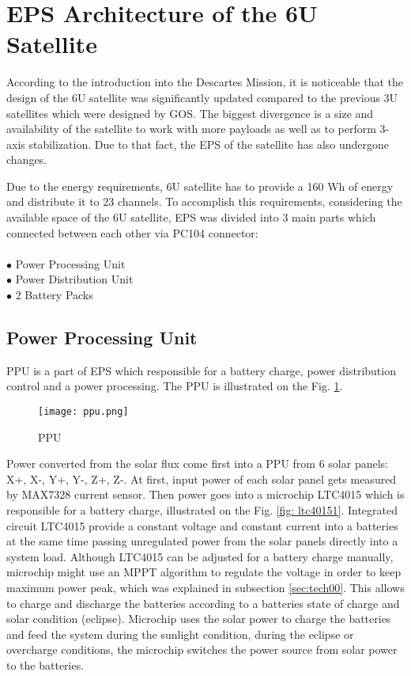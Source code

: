  
  \section{EPS Architecture of the 6U Satellite}
  According to the introduction into the  Descartes Mission, it is noticeable that the design of the 6U satellite was significantly updated compared to the previous 3U satellites which were designed by GOS. The biggest divergence is a size and availability of the satellite to work with more payloads as well as to perform 3-axis stabilization. Due to that fact, the EPS of the satellite has also undergone changes.
  
  Due to the energy requirements, 6U satellite has to provide a 160 Wh of energy and  distribute it to 23 channels. To accomplish this requirements, considering the available space of the 6U satellite, EPS was divided into 3 main parts which connected between each other via PC104 connector:\\ \\
  $\bullet$ Power Processing Unit\\
  $\bullet$ Power Distribution Unit\\
  $\bullet$ 2 Battery Packs\\
  
   \subsection{Power Processing Unit}
   PPU is a part of EPS which responsible for a battery charge, power distribution control and a power processing. The PPU is illustrated on the Fig. \ref{fig: psu122}.
   
   \begin{figure}[h]
   	\centering
   	\texttt{[image: ppu.png]}
   	\caption{PPU}
   	\label{fig: psu122}
   \end{figure}
   
   Power converted from the solar flux come first into a PPU from 6 solar panels: X+, X-, Y+, Y-, Z+, Z-. At first, input power of each solar panel gets measured by MAX7328 current sensor. Then power goes into a microchip LTC4015 which is responsible for a battery charge, illustrated on the Fig. \ref{fig: ltc40151}. Integrated circuit LTC4015 provide a constant voltage and constant current into a batteries at the same time passing unregulated power from the solar panels directly into a system load. Although LTC4015 can be adjusted for a battery charge manually, microchip might use an MPPT algorithm to regulate the voltage in order to keep maximum power peak, which was explained in subsection \ref{sec:tech00}. This allows to charge and discharge the batteries according to a batteries state of charge and solar condition (eclipse). Microchip uses the solar power to charge the batteries and feed the system  during the sunlight condition, during the eclipse or overcharge conditions, the microchip switches the power source from solar power to the batteries.
   
